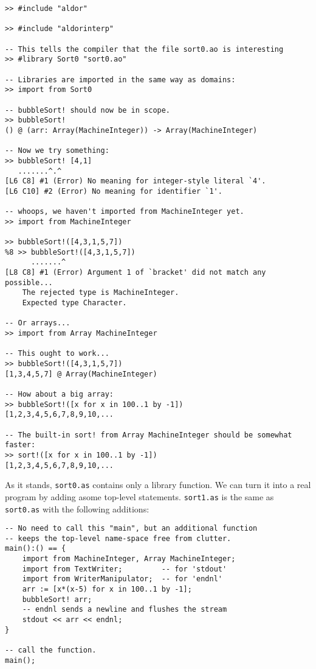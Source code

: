 \documentclass{article}
\begin{document}
\begin{small}
\begin{verbatim}
>> #include "aldor"

>> #include "aldorinterp"

-- This tells the compiler that the file sort0.ao is interesting
>> #library Sort0 "sort0.ao"

-- Libraries are imported in the same way as domains:
>> import from Sort0

-- bubbleSort! should now be in scope.
>> bubbleSort!
() @ (arr: Array(MachineInteger)) -> Array(MachineInteger)

-- Now we try something:
>> bubbleSort! [4,1]
   .......^.^
[L6 C8] #1 (Error) No meaning for integer-style literal `4'.
[L6 C10] #2 (Error) No meaning for identifier `1'.

-- whoops, we haven't imported from MachineInteger yet.
>> import from MachineInteger

>> bubbleSort!([4,3,1,5,7])
%8 >> bubbleSort!([4,3,1,5,7])
      .......^
[L8 C8] #1 (Error) Argument 1 of `bracket' did not match any possible...
    The rejected type is MachineInteger.
    Expected type Character.

-- Or arrays...
>> import from Array MachineInteger

-- This ought to work...
>> bubbleSort!([4,3,1,5,7])
[1,3,4,5,7] @ Array(MachineInteger)

-- How about a big array:
>> bubbleSort!([x for x in 100..1 by -1])
[1,2,3,4,5,6,7,8,9,10,...

-- The built-in sort! from Array MachineInteger should be somewhat faster:
>> sort!([x for x in 100..1 by -1])
[1,2,3,4,5,6,7,8,9,10,...

\end{verbatim}
\end{small}

As it stands, {\tt sort0.as} contains only a library function.  We can
turn it into a real program by adding asome top-level statements.
{\tt sort1.as} is the same as {\tt sort0.as} with the following additions:
\begin{small}
\begin{verbatim}
-- No need to call this "main", but an additional function
-- keeps the top-level name-space free from clutter.
main():() == {
    import from MachineInteger, Array MachineInteger;
    import from TextWriter;	        -- for 'stdout'
    import from WriterManipulator;	-- for 'endnl'
    arr := [x*(x-5) for x in 100..1 by -1];
    bubbleSort! arr;
    -- endnl sends a newline and flushes the stream
    stdout << arr << endnl;
}

-- call the function.
main();
\end{verbatim}
\end{small}
\end{document}

